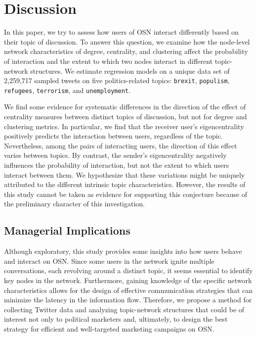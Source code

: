 \section{Discussion}\label{Discussion}\thispagestyle{SectionFirstPage} %
In this paper, we try to assess how users of OSN interact differently based on their topic of discussion. To answer this question, we examine how the node-level network characteristics of degree, centrality, and clustering affect the probability of interaction and the extent to which two nodes interact in different topic-network structures. We estimate regression models on a unique data set of 2,259,717 sampled tweets on five politics-related topics: \texttt{brexit}, \texttt{populism}, \texttt{refugees}, \texttt{terrorism}, and \texttt{unemployment}.

We find some evidence for systematic differences in the direction of the effect of centrality measures between distinct topics of discussion, but not for degree and clustering metrics. In particular, we find that the receiver user's eigencentrality positively predicts the interaction between users, regardless of the topic. Nevertheless, among the pairs of interacting users, the direction of this effect varies between topics. By contrast, the sender's eigencentrality negatively influences the probability of interaction, but not the extent to which users interact between them. We hypothesize that these variations might be uniquely attributed to the different intrinsic topic characteristics. However, the results of this study cannot be taken as evidence for supporting this conjecture because of the preliminary character of this investigation.
\subsection{Managerial Implications}
Although exploratory, this study provides some insights into how users behave and interact on OSN. Since some users in the network ignite multiple conversations, each revolving around a distinct topic, it seems essential to identify key nodes in the network. Furthermore, gaining knowledge of the specific network characteristics allows for the design of effective communication strategies that can minimize the latency in the information flow.
Therefore, we propose a method for collecting Twitter data and analyzing topic-network structures that could be of interest not only to political marketers and, ultimately, to design the best strategy for efficient and well-targeted marketing campaigns on OSN.
